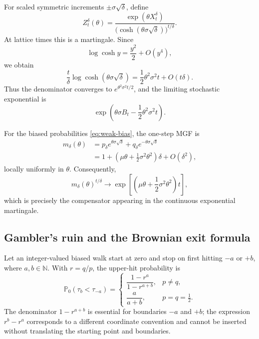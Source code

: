 \documentclass[10pt,a4paper]{article}
\numberwithin{equation}{section}
\theoremstyle{blueplain}
\theoremstyle{definition}
\newcommand{\Pp}{\mathbb P}
\begin{document}
For scaled symmetric increments \(\pm\sigma\sqrt\delta\), define
\begin{equation}
  Z_t^\delta(\theta)
  =\frac{\exp(\theta X_t^\delta)}
  {\bigl(\cosh(\theta\sigma\sqrt\delta)\bigr)^{t/\delta}}.
  \label{eq:scaled-exponential-martingale}
\end{equation}
At lattice times this is a martingale.  Since
\[
  \log\cosh y=\frac{y^2}{2}+O(y^4),
\]
we obtain
\begin{equation}
  \frac{t}{\delta}\log\cosh(\theta\sigma\sqrt\delta)
  =\frac12\theta^2\sigma^2t+O(t\delta).
  \label{eq:cosh-limit}
\end{equation}
Thus the denominator converges to
\(e^{\theta^2\sigma^2t/2}\), and the limiting stochastic exponential is
\begin{equation}
  \exp\!\left(\theta\sigma B_t-\frac12\theta^2\sigma^2t\right).
  \label{eq:srw-bm-exponential-limit}
\end{equation}

For the biased probabilities \eqref{eq:weak-bias}, the one-step MGF is
\begin{align}
  m_\delta(\theta)
  &=p_\delta e^{\theta\sigma\sqrt\delta}
    +q_\delta e^{-\theta\sigma\sqrt\delta}\\
  &=1+\left(\mu\theta+\frac12\sigma^2\theta^2\right)\delta
    +O(\delta^2),
  \label{eq:biased-step-mgf}
\end{align}
locally uniformly in \(\theta\).  Consequently,
\begin{equation}
  m_\delta(\theta)^{t/\delta}
  \longrightarrow
  \exp\!\left[
    \left(\mu\theta+\frac12\sigma^2\theta^2\right)t
  \right],
  \label{eq:biased-mgf-limit}
\end{equation}
which is precisely the compensator appearing in the continuous exponential
martingale.

\subsection{Gambler's ruin and the Brownian exit formula}

Let an integer-valued biased walk start at zero and stop on first hitting
\(-a\) or \(+b\), where \(a,b\in\mathbb N\).  With \(r=q/p\), the upper-hit
probability is
\begin{equation}
  \Pp_0(\tau_b<\tau_{-a})
  =
  \begin{cases}
  \dfrac{1-r^a}{1-r^{a+b}},&p\ne q,\\[2mm]
  \dfrac{a}{a+b},&p=q=\frac12.
  \end{cases}
  \label{eq:discrete-gambler-ruin}
\end{equation}
The denominator \(1-r^{a+b}\) is essential for boundaries \(-a\) and \(+b\);
the expression \(r^b-r^a\) corresponds to a different coordinate convention
and cannot be inserted without translating the starting point and boundaries.
\end{document}
